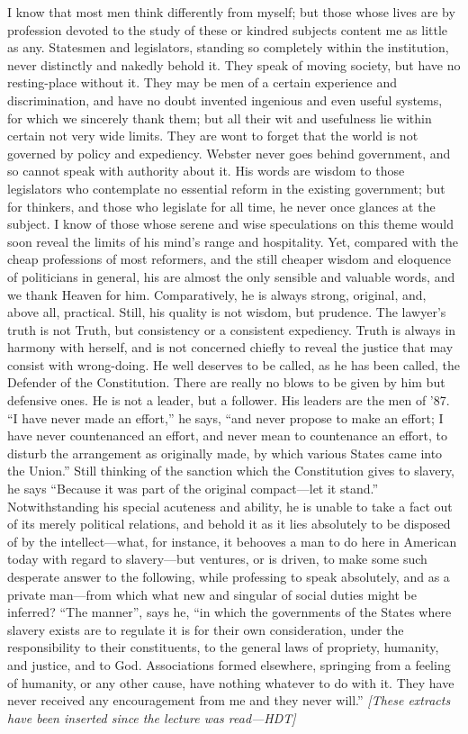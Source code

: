 \documentclass[letterpaper,12pt]{article}
\begin{document}
I know that most men think differently from myself; but those whose lives are by
profession devoted to the study of these or kindred subjects content me as
little as any. Statesmen and legislators, standing so completely within the
institution, never distinctly and nakedly behold it. They speak of moving
society, but have no resting-place without it. They may be men of a certain
experience and discrimination, and have no doubt invented ingenious and even
useful systems, for which we sincerely thank them; but all their wit and
usefulness lie within certain not very wide limits. They are wont to forget that
the world is not governed by policy and expediency. Webster never goes behind
government, and so cannot speak with authority about it. His words are wisdom to
those legislators who contemplate no essential reform in the existing
government; but for thinkers, and those who legislate for all time, he never
once glances at the subject. I know of those whose serene and wise speculations
on this theme would soon reveal the limits of his mind's range and hospitality.
Yet, compared with the cheap professions of most reformers, and the still
cheaper wisdom and eloquence of politicians in general, his are almost the only
sensible and valuable words, and we thank Heaven for him.  Comparatively, he is
always strong, original, and, above all, practical. Still, his quality is not
wisdom, but prudence. The lawyer's truth is not Truth, but consistency or
a consistent expediency. Truth is always in harmony with herself, and is not
concerned chiefly to reveal the justice that may consist with wrong-doing. He
well deserves to be called, as he has been called, the Defender of the
Constitution. There are really no blows to be given by him but defensive ones.
He is not a leader, but a follower. His leaders are the men of '87. \enquote{I
    have never made an effort,} he says, \enquote{and never propose to make an
    effort; I have never countenanced an effort, and never mean to countenance
    an effort, to disturb the arrangement as originally made, by which various
    States came into the Union.} Still thinking of the sanction which the
Constitution gives to slavery, he says \enquote{Because it was part of the
    original compact---let it stand.} Notwithstanding his special acuteness and
ability, he is unable to take a fact out of its merely political relations, and
behold it as it lies absolutely to be disposed of by the intellect---what, for
instance, it behooves a man to do here in American today with regard to
slavery---but ventures, or is driven, to make some such desperate answer to the
following, while professing to speak absolutely, and as a private man---from
which what new and singular of social duties might be inferred? \enquote{The
    manner}, says he, \enquote{in which the governments of the States where
    slavery exists are to regulate it is for their own consideration, under the
    responsibility to their constituents, to the general laws of propriety,
    humanity, and justice, and to God. Associations formed elsewhere, springing
    from a feeling of humanity, or any other cause, have nothing whatever to do
    with it. They have never received any encouragement from me and they never
    will.} \emph{[These extracts have been inserted since the lecture was
    read---HDT]}
\end{document}
